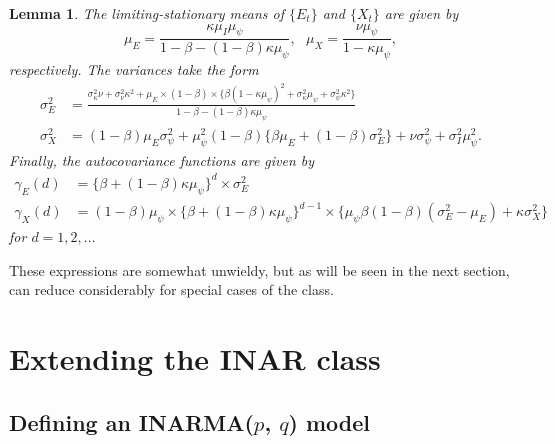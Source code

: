 \documentclass{article}
\newtheorem{lemma}{Lemma}
\begin{document}
\begin{lemma}
The limiting-stationary means of $\{E_t\}$ and $\{X_t\}$ are given by
$$
\mu_E = \frac{\kappa\mu_I\mu_\psi}{1 - \beta - (1 - \beta)\kappa\mu_\psi}, \ \ \ \mu_X = \frac{\nu\mu_\psi}{1 - \kappa\mu_\psi},
$$
respectively. The variances take the form
\begin{align*}
\sigma^2_E & = \frac{\sigma^2_\kappa \nu + \sigma^2_\nu\kappa^2 + \mu_E \times (1 - \beta) \times \{\beta (1 - \kappa\mu_\psi)^2 + \sigma^2_\kappa\mu_\psi + \sigma^2_\psi\kappa^2\}}{1 - \beta - (1 - \beta)\kappa\mu_\psi}\\
\sigma^2_X & = (1 - \beta)\mu_E \sigma^2_\psi + \mu_\psi^2(1 - \beta)\{\beta\mu_E + (1 - \beta)\sigma^2_E\} +
  \nu\sigma^2_\psi + \sigma^2_I\mu_\psi^2.
\end{align*}
Finally, the autocovariance functions are given by
\begin{align*}
\gamma_E(d) & = \{\beta + (1 - \beta)\kappa\mu_\psi\}^d \times \sigma^2_E\\
\gamma_X(d) & = (1 - \beta)\mu_\psi\times \{\beta + (1 - \beta)\kappa\mu_\psi\}^{d - 1} \times \{\mu_\psi\beta(1 - \beta)(\sigma^2_E - \mu_E) + \kappa\sigma^2_X\}
\end{align*}
for $d = 1, 2, \dots$
\end{lemma}
These expressions are somewhat unwieldy, but as will be seen in the next section, can reduce considerably for special cases of the class.


\section{Extending the INAR class}
\label{sec:extension_inar}

\subsection{Defining an INARMA($p$, $q$) model}
\end{document}
